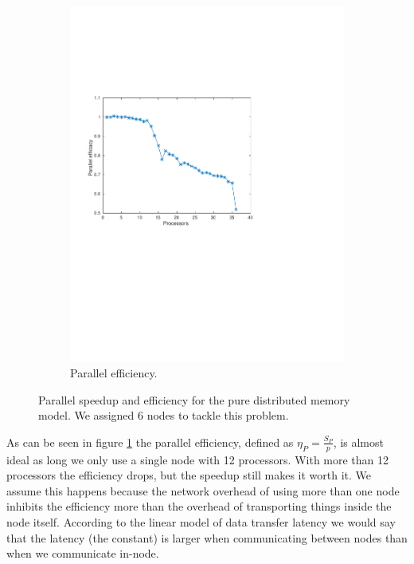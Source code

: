 \begin{figure}[h]
\begin{subfigure}[b]{0.45\textwidth}
			\includegraphics[width=\textwidth]{./figures/efficiacy}
			\caption{Parallel efficiency.}
			\label{fig:efficiacy}
        \end{subfigure}%
        \caption{Parallel speedup and efficiency for the pure distributed memory model. We assigned 6 nodes to tackle this problem.}
        \label{fig:analysis}
\end{figure}
As can be seen in figure \ref{fig:efficiacy} the parallel efficiency, defined as $\eta_P=\frac{S_P}{p}$, is almost ideal as long we only use a single node with 12 processors. With more than 12 processors the efficiency drops, but the speedup still makes it worth it. We assume this happens because the network overhead of using more than one node inhibits the efficiency more than the overhead of transporting things inside the node itself. According to the linear model of data transfer latency we would say that the latency (the constant) is larger when communicating between nodes than when we communicate in-node.


